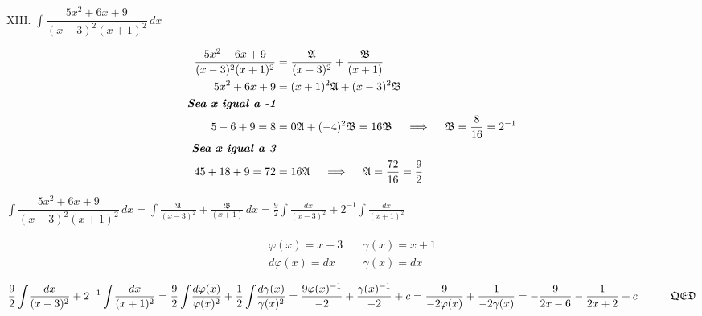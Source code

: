 \documentclass{article}
\newcommand{\ints}{\displaystyle \int \!}
\newcommand{\phix}{\varphi (x)}
\newcommand{\gammax}{\gamma (x)}
\newcommand{\qed}{\quad\quad\quad\mathfrak{QED}}
\newcommand{\A}{\mathfrak{A}}
\newcommand{\B}{\mathfrak{B}}
\newcommand{\plic}{\quad \implies \quad}
\begin{document}
\noindent XIII. $\ints \dfrac{5x^2 + 6x + 9}{(x-3)^2(x+1)^2} \, dx$
\begin{center}
\begin{tcolorbox}[title=Método de reducción por fracciones parciales, width=0.7\linewidth, top=0pt]
\begin{align*}
    \frac{5x^2 + 6x + 9}{(x-3)^2(x+1)^2} &= \frac{\A}{(x-3)^2} + \frac{\B}{(x+1)} \\
    5x^2 + 6x + 9 &= (x+1)^2\A + (x-3)^2\B \\
    \textit{\textbf{Sea x igual a -1}}& \\
    5 - 6 + 9 = 8 &= 0\A + (-4)^2 \B = 16 \B \plic \B = \frac{8}{16} = 2^{-1} \\
    \textit{\textbf{Sea x igual a 3}}& \\
    45 + 18 + 9 = 72 &= 16 \A \plic \A = \frac{72}{16}= \frac{9}{2}
\end{align*}
\end{tcolorbox}
\end{center}
\(
\ints \dfrac{5x^2 + 6x + 9}{(x-3)^2(x+1)^2} \, dx = \ints \frac{\A}{(x-3)^2} + \frac{\B}{(x+1)} \, dx = \frac{9}{2}\ints \frac{dx}{(x-3)^2} + 2^{-1}\ints \frac{dx}{(x+1)^2}
\)
\begin{center}
\begin{tcolorbox}[title=Considérense los siguientes cambios de variable, width=0.7\linewidth, top=0pt]
\begin{align*}
    \phix = x-3 &\quad \gammax = x+1 \\
    d\phix = dx &\quad \gammax = dx
\end{align*}
\end{tcolorbox}
\end{center}
\(
\dfrac{9}{2}\ints \frac{dx}{(x-3)^2} + 2^{-1}\ints \frac{dx}{(x+1)^2} = \frac{9}{2} \ints \frac{d\phix}{\phix^2} + \frac{1}{2} \ints \frac{d\gammax}{\gammax^2} = \frac{9\phix^{-1}}{-2} + \frac{\gammax^{-1}}{-2} + c = \frac{9}{-2\phix} + \frac{1}{-2\gammax} \\\\\\
= - \frac{9}{2x-6} -  \frac{1}{2x+2} + c \qed
\)
\\\\\\\\
\end{document}
